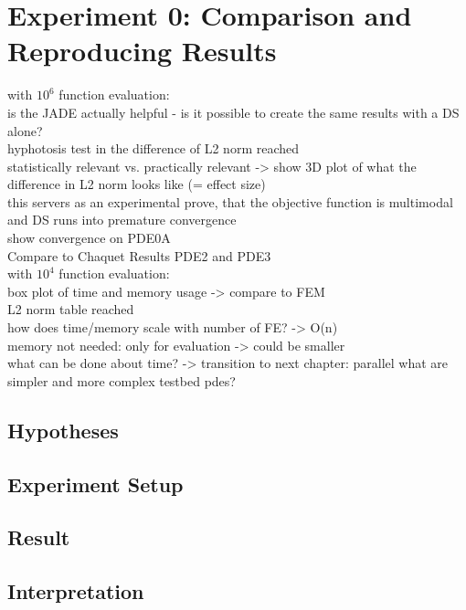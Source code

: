 \documentclass[./\jobname.tex]{subfiles}
\begin{document}
\chapter {Experiment 0: Comparison and Reproducing Results}
\label{chap:experimet_0}

with $10^6$ function evaluation: \\
is the JADE actually helpful - is it possible to create the same results with a DS alone? \\
hyphotosis test in the difference of L2 norm reached \\
statistically relevant vs. practically relevant -> show 3D plot of what the difference in L2 norm looks like (= effect size) \\
this servers as an experimental prove, that the objective function is multimodal and DS runs into premature convergence \\

show convergence on PDE0A \\
Compare to Chaquet Results PDE2 and PDE3\\

with $10^4$ function evaluation: \\
box plot of time and memory usage -> compare to FEM \\
L2 norm table reached \\
how does time/memory scale with number of FE? -> O(n)\\
memory not needed: only for evaluation -> could be smaller \\
what can be done about time? -> transition to next chapter: parallel
what are simpler and more complex testbed pdes? \\

\section{Hypotheses}

\begin{algorithm}[H]
	\SetAlgoNoLine
	\DontPrintSemicolon
	\label{algo: memeticJADE}
\end{algorithm}

\section{Experiment Setup}

\section{Result}

\section{Interpretation}
\end{document}

